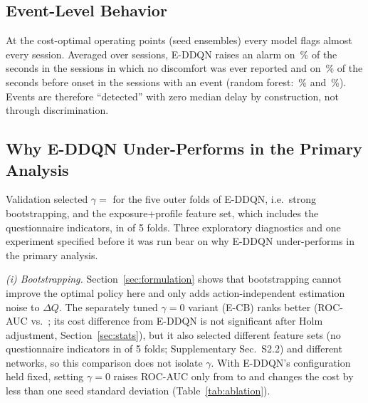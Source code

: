 \begin{table}[t]
\centering
\caption{Paired comparisons with E-DDQN (A) on the same \nSamplesEval{} test samples (seed ensembles, rule D1). $b$: A correct, B wrong; $c$: A wrong, B correct. $\Delta$Cost is the difference of the seed-ensemble costs (Table~\ref{tab:main}, right block); its CI and $p_{\text{group}}$ come from 2,000 group-bootstrap replicates (unadjusted; Holm-adjusted values in the text); $p_{\text{exact}}$ is the sample-level exact McNemar test, which ignores within-session dependence.}
\label{tab:paired}
\footnotesize

\end{table}

\subsection{Event-Level Behavior}
At the cost-optimal operating points (seed ensembles) every model flags almost every session. Averaged over sessions, E-DDQN raises an alarm on \EDDQNEvFreeAlarm\,\% of the seconds in the \nEventFreeSessions{} sessions in which no discomfort was ever reported and on \EDDQNEvPreAlarm\,\% of the seconds before onset in the \nEventSessions{} sessions with an event (random forest: \RFEvFreeAlarm\,\% and \RFEvPreAlarm\,\%). Events are therefore ``detected'' with zero median delay by construction, not through discrimination.

\subsection{Why E-DDQN Under-Performs in the Primary Analysis}
\label{sec:why}
Validation selected $\gamma=$ \EDDQNGammas{} for the five outer folds of E-DDQN, i.e.\ strong bootstrapping, and the exposure+profile feature set, which includes the questionnaire indicators, in \EDDQNnProfile{} of 5 folds. Three exploratory diagnostics and one experiment specified before it was run bear on why E-DDQN under-performs in the primary analysis.

\emph{(i) Bootstrapping.} Section~\ref{sec:formulation} shows that bootstrapping cannot improve the optimal policy here and only adds action-independent estimation noise to $\Delta Q$. The separately tuned $\gamma=0$ variant (E-CB) ranks better (ROC-AUC \ECBCostRocAucMean{} vs.\ \EDDQNCostRocAucMean; its cost difference from E-DDQN is not significant after Holm adjustment, Section~\ref{sec:stats}), but it also selected different feature sets (no questionnaire indicators in \PHECBNoProfileFolds{} of 5 folds; Supplementary Sec.~S2.2) and different networks, so this comparison does not isolate $\gamma$. With E-DDQN's configuration held fixed, setting $\gamma=0$ raises ROC-AUC only from \EDDQNCostRocAucMean{} to \AblGammaZeroCostRocAuc{} and changes the cost by less than one seed standard deviation (Table~\ref{tab:ablation}).

